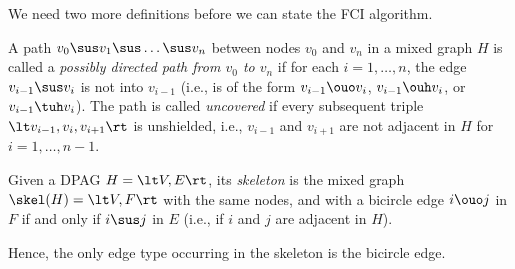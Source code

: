 We need two more definitions before we can state the FCI algorithm.
\begin{Def}\label{def:pdpath}
  A path $v_0 \sus v_1 \sus \dots \sus v_n$ between nodes $v_0$ and $v_n$ in a mixed graph $H$ is called a \emph{possibly directed path from $v_0$ to $v_n$} if for each $i=1,\dots,n$, the edge $v_{i-1} \sus v_i$ is not into $v_{i-1}$ (i.e., is of the form $v_{i-1} \ouo v_i$, $v_{i-1} \ouh v_i$, or $v_{i-1} \tuh v_i$). 
  The path is called \emph{uncovered} if every subsequent triple $\lt v_{i-1}, v_i, v_{i+1} \rt$ is unshielded, i.e., $v_{i-1}$ and $v_{i+1}$ are not adjacent in $H$ for $i=1,\dots,n-1$.
\end{Def}
\begin{Def}\label{def:skeleton}
Given a DPAG $H = \lt V, E \rt$, its \emph{skeleton} is the mixed graph 
$\skel(H) = \lt V, F \rt$ with the same nodes, and with a bicircle edge $i \ouo j$ in $F$
  if and only if $i \sus j$ in $E$ (i.e., if $i$ and $j$ are adjacent in $H$).
\end{Def}
Hence, the only edge type occurring in the skeleton is the bicircle edge.


